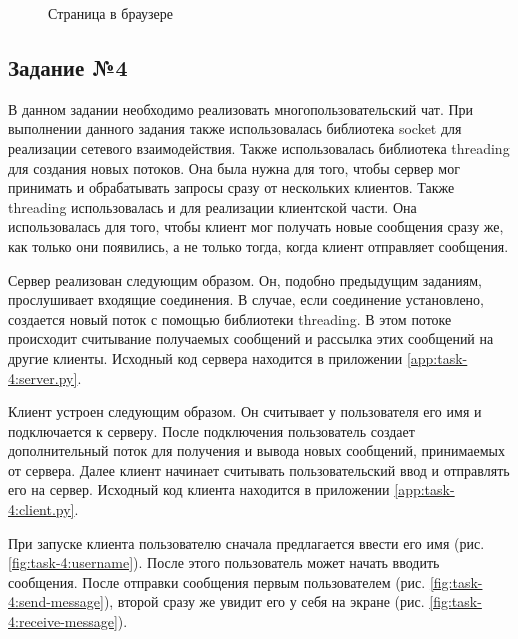 \documentclass[a4paper, 14pt]{extarticle}
\begin{document}
\begin{figure}[H]
  \centering
  \caption{Страница в браузере}
  \label{fig:task-3:browser}
\end{figure}

\subsection*{Задание №4}

В данном задании необходимо реализовать многопользовательский чат. При
выполнении данного задания также использовалась библиотека socket для реализации
сетевого взаимодействия. Также использовалась библиотека threading для создания
новых потоков. Она была нужна для того, чтобы сервер мог принимать и
обрабатывать запросы сразу от нескольких клиентов. Также threading
использовалась и для реализации клиентской части. Она использовалась для того,
чтобы клиент мог получать новые сообщения сразу же, как только они появились, а
не только тогда, когда клиент отправляет сообщения.

Сервер реализован следующим образом. Он, подобно предыдущим заданиям,
прослушивает входящие соединения. В случае, если соединение установлено,
создается новый поток с помощью библиотеки threading. В этом потоке происходит
считывание получаемых сообщений и рассылка этих сообщений на другие клиенты.
Исходный код сервера находится в приложении \ref{app:task-4:server.py}.

Клиент устроен следующим образом. Он считывает у пользователя его имя и
подключается к серверу. После подключения пользователь создает дополнительный
поток для получения и вывода новых сообщений, принимаемых от сервера. Далее
клиент начинает считывать пользовательский ввод и отправлять его на сервер.
Исходный код клиента находится в приложении \ref{app:task-4:client.py}.

При запуске клиента пользователю сначала предлагается ввести его имя (рис.
\ref{fig:task-4:username}). После этого пользователь может начать вводить
сообщения. После отправки сообщения первым пользователем (рис.
\ref{fig:task-4:send-message}), второй сразу же увидит его у себя на экране
(рис. \ref{fig:task-4:receive-message}).
\end{document}
